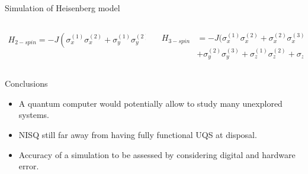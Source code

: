 \documentclass{beamer}
\begin{document}
\begin{frame}{Simulation of Heisenberg model}
\begin{columns}

\begin{column}{0.5\textwidth}
{\scriptsize
\begin{align*}
H_{2-spin} = -J(\sigma_x^{(1)}\sigma_x^{(2)}+\sigma_y^{(1)}\sigma_y^{(2)}+\sigma_z^{(1)}\sigma_z^{(2)})
\end{align*}
}
\end{column}

\begin{column}{0.5\textwidth}
{\scriptsize
\begin{align*}
H_{3-spin} &= -J(\sigma_x^{(1)}\sigma_x^{(2)}+\sigma_x^{(2)}\sigma_x^{(3)}+\sigma_y^{(1)}\sigma_y^{(2)}+ \\
&+\sigma_y^{(2)}\sigma_y^{(3)}+\sigma_z^{(1)}\sigma_z^{(2)}+\sigma_z^{(2)}\sigma_z^{(3)})
\end{align*}
}
\end{column}

\end{columns}
\end{frame}

\begin{frame}{Conclusions}
\begin{itemize}
\item A quantum computer would potentially allow to study many unexplored systems.
\item NISQ still far away from having fully functional UQS at disposal.
\item Accuracy of a simulation to be assessed by considering digital and hardware error.
\end{itemize}
\vspace{20mm}

\end{frame}
\end{document}

